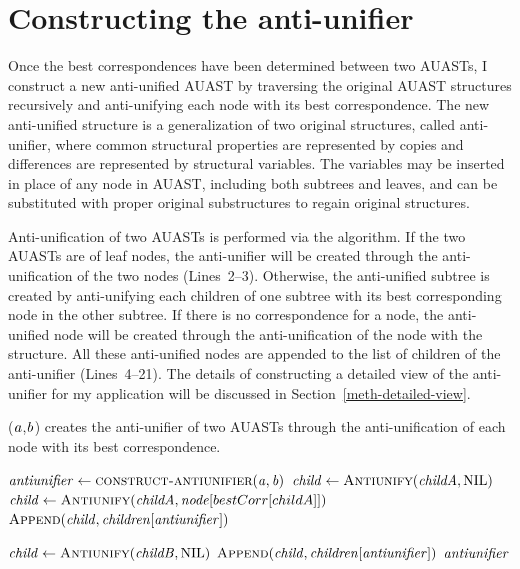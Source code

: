 \section{Constructing the anti-unifier} \label{meth-antiUnifier}
Once the best correspondences have been determined between two AUASTs, I construct a new anti-unified AUAST by traversing the original AUAST structures recursively and anti-unifying each node with its best correspondence. The new anti-unified structure is a generalization of two original structures, called anti-unifier, where common structural properties are represented by copies and differences are represented by structural variables. The variables may be inserted in place of any node in AUAST, including both subtrees and leaves, and can be substituted with proper original substructures to regain original structures.



Anti-unification of two AUASTs is performed via the  algorithm. If the two AUASTs are of leaf nodes, the anti-unifier will be created through the anti-unification of the two nodes (Lines~2--3). Otherwise, the anti-unified subtree is created by anti-unifying each children of one subtree with its best corresponding node in the other subtree. If there is no correspondence for a node, the anti-unified node will be created through the anti-unification of the node with the \NIL{} structure. All these anti-unified nodes are appended to the list of children of the anti-unifier (Lines~4--21). The details of constructing a detailed view of the anti-unifier for my application will be discussed in Section~\ref{meth-detailed-view}.


\begin{algorithm}
 \caption{($\mathit{a}$,$\mathit{b}$) creates the anti-unifier of two AUASTs through the anti-unification of each node with its best correspondence.}
  \label{AntiUnify}
  \begin{algorithmic}[1]
\AntiUnify
{}
  \State $\mathit{antiunifier} \gets   \textsc{construct-antiunifier}(\mathit{a},\mathit{b})$
  \State $\mathit{child} \gets   \textsc{Antiunify}(\mathit{childA},\textrm{NIL})$
\Else	
 \State $\mathit{child} \gets   \textsc{Antiunify}(\mathit{childA},\mathit{node}[bestCorr[childA]])$
\EndIf
\State $\textsc{Append}(\mathit{child},\mathit{children[antiunifier]})$
\EndFor
\EndIf

  \State $\mathit{child} \gets   \textsc{Antiunify}(\mathit{childB},\textrm{NIL})$
\EndIf
\State $\textsc{Append}(\mathit{child},\mathit{children[antiunifier]})$
\EndFor
 \EndIf
\Return $\mathit{antiunifier}$
\end{algorithmic}
\end{algorithm}



